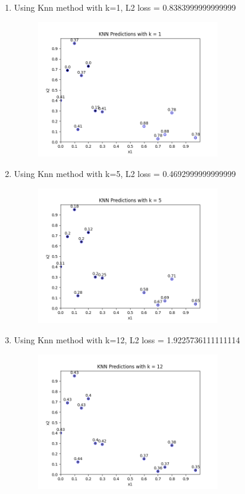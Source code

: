 \documentclass[submit]{harvardml}
\begin{document}
\begin{enumerate}
\begin{enumerate}
        \item Using Knn method with k=1, L2 loss = 0.8383999999999999 \\
        \begin{figure}[H]
            \includegraphics[width=8cm]{hw1/T1P2_plots/plot4.png}
            \centering
        \end{figure}
        
        \item Using Knn method with k=5, L2 loss = 0.4692999999999999 \\
        \begin{figure}[H]
            \includegraphics[width=8cm]{hw1/T1P2_plots/plot5.png}
            \centering
        \end{figure}
        
        \item Using Knn method with k=12, L2 loss = 1.9225736111111114 \\
        \begin{figure}[H]
            \includegraphics[width=8cm]{hw1/T1P2_plots/plot6.png}
            \centering
        \end{figure}
        

\end{enumerate}
\end{enumerate}
\end{document}
